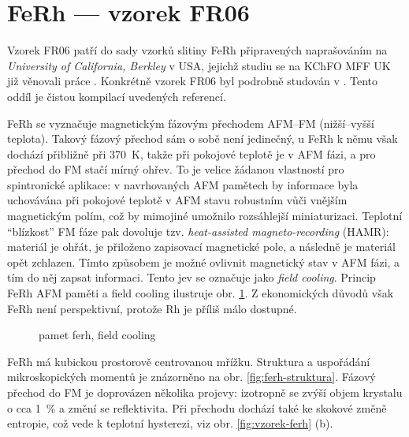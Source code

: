 \section{FeRh --- vzorek FR06}
\label{chap:vzorek-ferh}

Vzorek FR06 patří do sady vzorků slitiny FeRh připravených naprašováním na \emph{University of California, Berkley} v USA, jejichž studiu se na KChFO MFF UK již věnovali práce \cite{brajerLaserovaSpektroskopieMaterialu2015,saidlUltrarychlaLaserovaSpektroskopie2018,kubascikMagnetooptickeStudiumAntiferomagnetickych2019}.
Konkrétně vzorek FR06 byl podrobně studován v \cite{saidlUltrarychlaLaserovaSpektroskopie2018,kubascikMagnetooptickeStudiumAntiferomagnetickych2019}.
Tento oddíl je čistou kompilací uvedených referencí.

FeRh se vyznačuje magnetickým fázovým přechodem AFM--FM (nižší--vyšší teplota).
Takový fázový přechod sám o sobě není jedinečný, u FeRh k němu však dochází přibližně při \SI{370}{\kelvin}, takže při pokojové teplotě je v AFM fázi, a pro přechod do FM stačí mírný ohřev.
To je velice žádanou vlastností pro spintronické aplikace: v navrhovaných AFM pamětech by informace byla uchovávána při pokojové teplotě v AFM stavu robustním vůči vnějším magnetickým polím, což by mimojiné umožnilo rozsáhlejší miniaturizaci.
Teplotní ``blízkost'' FM fáze pak dovoluje tzv. \emph{heat-assisted magneto-recording} (HAMR): materiál je ohřát, je přiloženo zapisovací magnetické pole, a následně je materiál opět zchlazen.
Tímto způsobem je možné ovlivnit magnetický stav v AFM fázi, a tím do něj zapsat informaci.
Tento jev se označuje jako \emph{field cooling}.
Princip FeRh AFM paměti a field cooling ilustruje obr. \ref{fig:ferh-memory}.
Z ekonomických důvodů však FeRh není perspektivní, protože Rh je příliš málo dostupné.

\begin{figure}[htbp]
    \centering
    \caption{pamet ferh, field cooling}
    \label{fig:ferh-memory}
\end{figure}

FeRh má kubickou prostorově centrovanou mřížku.
Struktura a uspořádání mikroskopických momentů je znázorněno na obr. \ref{fig:ferh-struktura}.
Fázový přechod do FM je doprovázen několika projevy: izotropně se zvýší objem krystalu o cca \SI{1}{\percent} a změní se reflektivita.
Při přechodu dochází také ke skokové změně entropie, což vede k teplotní hysterezi, viz obr. \ref{fig:vzorek-ferh} (b).

